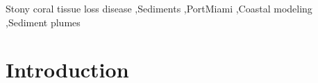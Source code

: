 \documentclass[preprint,12pt,authoryear]{elsarticle}
\begin{document}
\begin{frontmatter}


    \begin{keyword}
        Stony coral tissue loss disease \sep Sediments \sep PortMiami \sep Coastal modeling \sep Sediment plumes 



    \end{keyword}

\end{frontmatter}

\linenumbers

\section{Introduction}
\end{document}
